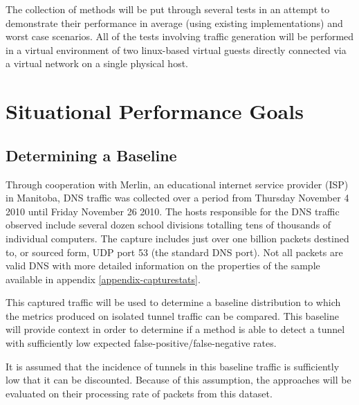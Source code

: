 \documentclass[12pt]{report}
\theoremstyle{remark}
\theoremstyle{definition}
\theoremstyle{definition}
\theoremstyle{definition}
\begin{document}
The collection of methods will be put through several tests in an attempt to
demonstrate their performance in average (using existing implementations) and
worst case scenarios. All of the tests involving traffic generation will be
performed in a virtual environment of two linux-based virtual guests directly
connected via a virtual network on a single physical host.

\section{Situational Performance Goals}
\subsection{Determining a Baseline}
\label{baseline}
Through cooperation with Merlin, an educational internet service provider (ISP)
in Manitoba, DNS traffic was collected over a period from Thursday November 4
2010 until Friday November 26 2010. The hosts responsible for the DNS traffic
observed include several dozen school divisions totalling tens of thousands of
individual computers. The capture includes just over one billion packets
destined to, or sourced form, UDP port 53 (the standard DNS port). Not all
packets are valid DNS with more detailed information on the properties of the
sample available in appendix \ref{appendix-capturestats}.

This captured traffic will be used to determine a baseline distribution to which
the metrics produced on isolated tunnel traffic can be compared. This baseline
will provide context in order to determine if a method is able to detect a
tunnel with sufficiently low expected false-positive/false-negative rates.

It is assumed that the incidence of tunnels in this baseline traffic is
sufficiently low that it can be discounted. Because of this assumption, the
approaches will be evaluated on their processing rate of packets from this
dataset.

\end{document}

